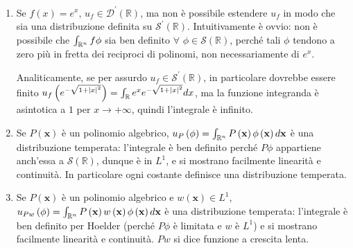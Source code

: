 \documentclass{article}
\begin{document}
\begin{enumerate}
\item Se $f\left( x\right) =e^{x}$, $u_{f}\in \mathcal{D}^{\prime }\left( 
\mathbb{R}
\right) $, ma non \`{e} possibile estendere $u_{f}$ in modo che sia una
distribuzione definita su $\mathcal{S}^{\prime }\left( 
\mathbb{R}
\right) $. Intuitivamente \`{e} ovvio: non \`{e} possibile che $\int_{%
\mathbb{R}
^{n}}f\phi $ sia ben definito $\forall $ $\phi \in \mathcal{S}\left( 
\mathbb{R}
\right) $, perch\'{e} tali $\phi $ tendono a zero pi\`{u} in fretta dei
reciproci di polinomi, non necessariamente di $e^{x}$.

Analiticamente, se per assurdo $u_{f}\in \mathcal{S}^{\prime }\left( 
\mathbb{R}
\right) $, in particolare dovrebbe essere finito $u_{f}\left( e^{-\sqrt{%
1+\left\vert x\right\vert ^{2}}}\right) =\int_{%
\mathbb{R}
}e^{x}e^{-\sqrt{1+\left\vert x\right\vert ^{2}}}dx$, ma la funzione
integranda \`{e} asintotica a $1$ per $x\rightarrow +\infty $, quindi
l'integrale \`{e} infinito.

\item Se $P\left( \mathbf{x}\right) $ \`{e} un polinomio algebrico, $%
u_{P}\left( \phi \right) =\int_{%
\mathbb{R}
^{n}}P\left( \mathbf{x}\right) \phi \left( \mathbf{x}\right) d\mathbf{x}$ 
\`{e} una distribuzione temperata: l'integrale \`{e} ben definito perch\'{e} 
$P\phi $ appartiene anch'essa a $\mathcal{S}\left( 
\mathbb{R}
\right) $, dunque \`{e} in $L^{1}$, e si mostrano facilmente linearit\`{a} e
continuit\`{a}. In particolare ogni costante definisce una distribuzione
temperata.

\item Se $P\left( \mathbf{x}\right) $ \`{e} un polinomio algebrico e $%
w\left( \mathbf{x}\right) \in L^{1}$, $u_{Pw}\left( \phi \right) =\int_{%
\mathbb{R}
^{n}}P\left( \mathbf{x}\right) w\left( \mathbf{x}\right) \phi \left( \mathbf{%
x}\right) d\mathbf{x}$ \`{e} una distribuzione temperata: l'integrale \`{e}
ben definito per Hoelder (perch\'{e} $P\phi $ \`{e} limitata e $w$ \`{e} $%
L^{1}$) e si mostrano facilmente linearit\`{a} e continuit\`{a}. $Pw$ si
dice funzione a crescita lenta.


\end{enumerate}
\end{document}
